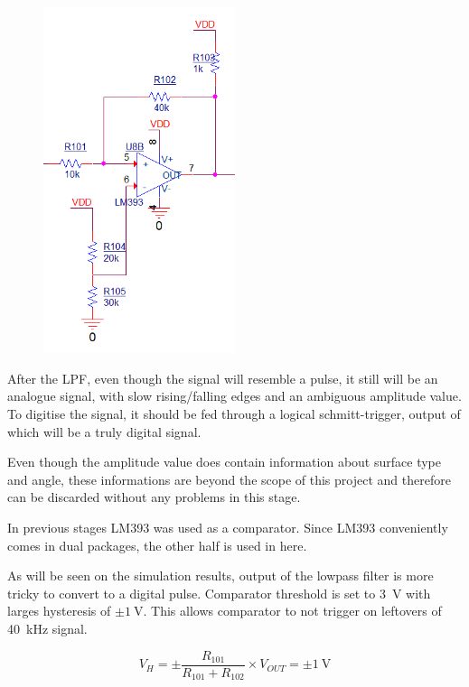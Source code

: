 \documentclass[12pt, a4paper]{article}
\begin{document}
            \begin{figure}[H]\centering
                \includegraphics[width=0.5\textwidth]{schematics/schmitt.png}
                \caption[]{}
            \end{figure}
            
            After the LPF, even though the signal will resemble a pulse, it still will be an analogue signal, with slow rising/falling edges and an ambiguous amplitude value. To digitise the signal, it should be fed through a logical schmitt-trigger, output of which will be a truly digital signal. 

            Even though the amplitude value does contain information about surface type and angle, these informations are beyond the scope of this project and therefore can be discarded without any problems in this stage.

            In previous stages LM393 was used as a comparator. Since LM393 conveniently comes in dual packages, the other half is used in here. 

            As will be seen on the simulation results, output of the lowpass filter is more tricky to convert to a digital pulse. Comparator threshold is set to \SI{3}{\volt} with larges hysteresis of $\pm \SI{1}{\volt}$. This allows comparator to not trigger on leftovers of \SI{40}{\kilo\hertz} signal.

            \begin{equation}
                V_H = \pm \frac{ R_{101} } {R_{101} + R_{102} } \times V_{OUT} = \pm \SI{1}{\volt}
            \end{equation}
            
\end{document}
